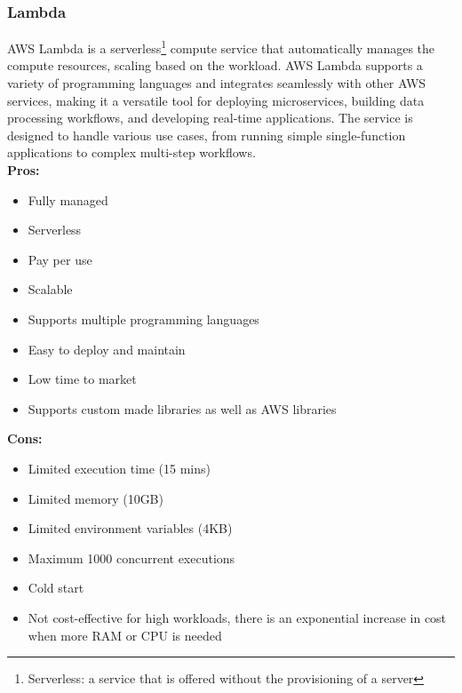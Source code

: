         \subsubsection{Lambda}
        \label{aws:lambda}
 AWS Lambda is a serverless\footnote{Serverless: a service that is offered without the provisioning of a server} compute service that automatically manages the compute resources, scaling based on the workload. AWS Lambda supports a variety of programming languages and integrates seamlessly with other AWS services, making it a versatile tool for deploying microservices, building data processing workflows, and developing real-time applications. The service is designed to handle various use cases, from running simple single-function applications to complex multi-step workflows.\\
        \textbf{Pros:}
        \begin{itemize}
            \item Fully managed
            \item Serverless
            \item Pay per use
            \item Scalable
            \item Supports multiple programming languages
            \item Easy to deploy and maintain
            \item Low time to market
            \item Supports custom made libraries as well as AWS libraries
        \end{itemize}
        \textbf{Cons:}
        \begin{itemize}
            \item Limited execution time (15 mins)
            \item Limited memory (10GB)
            \item Limited environment variables (4KB)
            \item Maximum 1000 concurrent executions
            \item Cold start
            \item Not cost-effective for high workloads, there is an exponential increase in cost when more RAM or CPU is needed
        \end{itemize}

